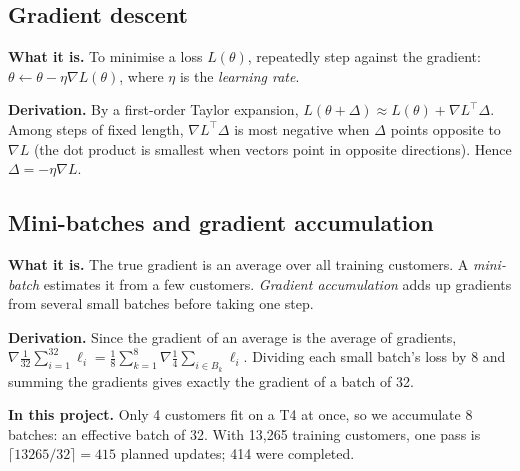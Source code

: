 \documentclass[10pt,a4paper]{article}
\newcommand{\what}[1]{\par\textbf{What it is.} #1}
\newcommand{\here}[1]{\par\textbf{In this project.} #1}
\newcommand{\deriv}{\par\textbf{Derivation.} }
\begin{document}
\subsection{Gradient descent}
\what{To minimise a loss $L(\theta)$, repeatedly step against the gradient: $\theta\leftarrow\theta-\eta\nabla L(\theta)$, where $\eta$ is the \emph{learning rate}.}
\deriv By a first-order Taylor expansion, $L(\theta+\Delta)\approx L(\theta)+\nabla L^\top\Delta$. Among steps of fixed length, $\nabla L^\top\Delta$ is most negative when $\Delta$ points opposite to $\nabla L$ (the dot product is smallest when vectors point in opposite directions). Hence $\Delta=-\eta\nabla L$.

\subsection{Mini-batches and gradient accumulation}
\what{The true gradient is an average over all training customers. A \emph{mini-batch} estimates it from a few customers. \emph{Gradient accumulation} adds up gradients from several small batches before taking one step.}
\deriv Since the gradient of an average is the average of gradients, $\nabla\frac{1}{32}\sum_{i=1}^{32}\ell_i=\frac18\sum_{k=1}^{8}\nabla\frac14\sum_{i\in B_k}\ell_i$. Dividing each small batch's loss by 8 and summing the gradients gives exactly the gradient of a batch of 32.
\here{Only 4 customers fit on a T4 at once, so we accumulate 8 batches: an effective batch of 32. With 13,265 training customers, one pass is $\lceil13265/32\rceil=415$ planned updates; 414 were completed.}
\end{document}
